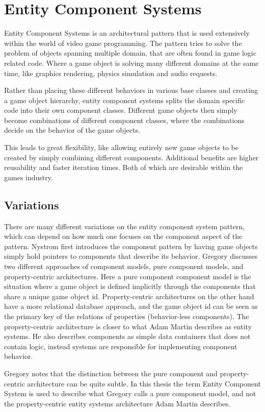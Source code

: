 \section{Entity Component Systems}
Entity Component Systems is an architectural pattern that is used extensively within the world of video game programming.
The pattern tries to solve the problem of objects spanning multiple domain, that are often found in game logic related code.
Where a game object is solving many different domains at the same time, like graphics rendering, physics simulation and
audio requests.

Rather than placing these different behaviors in various base classes and creating a game object hierarchy,
entity component systems splits the domain specific code into their own component classes.
Different game objects then simply become combinations of different component classes,
where the combinations decide on the behavior of the game objects.

This leads to great flexibility, like allowing entirely new game objects to be created by simply combining different components.
Additional benefits are higher reusability and faster iteration times.
Both of which are desirable within the games industry\cite{game_programming_patterns}.

\subsection{Variations}
There are many different variations on the entity component system pattern, which can depend on how much one focuses on
the component aspect of the pattern.
Nystrom\cite[component]{game_programming_patterns} first introduces the component pattern by having game objects simply hold
pointers to components that describe its behavior.
Gregory\cite[p. 886]{game_engine_architecture} discusses two different approaches of component models, pure component models,
and property-centric architectures. Here a pure component component model is the situation where a game object is defined
implicitly through the components that share a unique game object id.
Property-centric architectures on the other hand have a more relational database approach, and the game object id can be seen
as the primary key of the relations of properties (behavior-less components).
The property-centric architecture is closer to what Adam Martin\cite{t_machine_entity_systems} describes as entity systems.
He also describes components as simple data containers that does not contain logic,
instead systems are responsible for implementing component behavior.

Gregory\cite[p. 890]{game_engine_architecture} notes that the distinction between the pure component and property-centric
architecture can be quite subtle.
In this thesis the term Entity Component System is used to describe what Gregory calls a pure component model,
and not the property-centric entity systems architecture Adam Martin describes.

